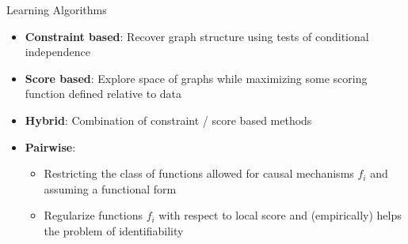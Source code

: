 \documentclass{beamer}
\begin{document}
\begin{frame}{Learning Algorithms}
	\begin{itemize}
		\item \textbf{Constraint based}: Recover graph structure using tests of conditional independence
		\item \textbf{Score based}: Explore space of graphs while maximizing some scoring function defined relative to data
		\item \textbf{Hybrid}: Combination of constraint / score based methods
		\item \textbf{Pairwise}:
		      \begin{itemize}
			      \item Restricting the class of functions allowed for causal mechanisms $f_{i}$ and assuming a functional form
			      \item Regularize functions $f_{i}$ with respect to local score and (empirically) helps the problem of identifiability
		      \end{itemize}
	\end{itemize}
\end{frame}
\end{document}
